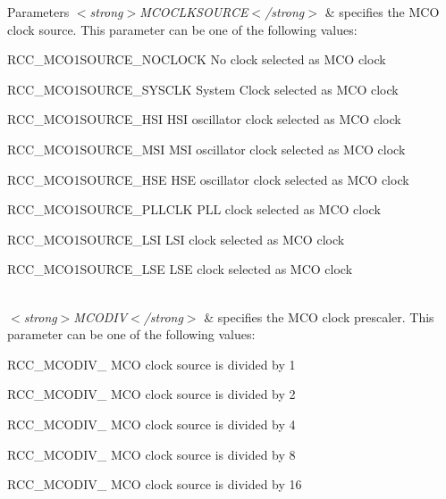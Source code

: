 \begin{DoxyParams}{Parameters}
{\em $<$strong$>$\-M\-C\-O\-C\-L\-K\-S\-O\-U\-R\-C\-E$<$/strong$>$} & specifies the M\-C\-O clock source. This parameter can be one of the following values\-: \begin{DoxyItemize}
\item R\-C\-C\-\_\-\-M\-C\-O1\-S\-O\-U\-R\-C\-E\-\_\-\-N\-O\-C\-L\-O\-C\-K No clock selected as M\-C\-O clock \item R\-C\-C\-\_\-\-M\-C\-O1\-S\-O\-U\-R\-C\-E\-\_\-\-S\-Y\-S\-C\-L\-K System Clock selected as M\-C\-O clock \item R\-C\-C\-\_\-\-M\-C\-O1\-S\-O\-U\-R\-C\-E\-\_\-\-H\-S\-I H\-S\-I oscillator clock selected as M\-C\-O clock \item R\-C\-C\-\_\-\-M\-C\-O1\-S\-O\-U\-R\-C\-E\-\_\-\-M\-S\-I M\-S\-I oscillator clock selected as M\-C\-O clock \item R\-C\-C\-\_\-\-M\-C\-O1\-S\-O\-U\-R\-C\-E\-\_\-\-H\-S\-E H\-S\-E oscillator clock selected as M\-C\-O clock \item R\-C\-C\-\_\-\-M\-C\-O1\-S\-O\-U\-R\-C\-E\-\_\-\-P\-L\-L\-C\-L\-K P\-L\-L clock selected as M\-C\-O clock \item R\-C\-C\-\_\-\-M\-C\-O1\-S\-O\-U\-R\-C\-E\-\_\-\-L\-S\-I L\-S\-I clock selected as M\-C\-O clock \item R\-C\-C\-\_\-\-M\-C\-O1\-S\-O\-U\-R\-C\-E\-\_\-\-L\-S\-E L\-S\-E clock selected as M\-C\-O clock \end{DoxyItemize}
\\
\hline
{\em $<$strong$>$\-M\-C\-O\-D\-I\-V$<$/strong$>$} & specifies the M\-C\-O clock prescaler. This parameter can be one of the following values\-: \begin{DoxyItemize}
\item R\-C\-C\-\_\-\-M\-C\-O\-D\-I\-V\-\_ M\-C\-O clock source is divided by 1 \item R\-C\-C\-\_\-\-M\-C\-O\-D\-I\-V\-\_ M\-C\-O clock source is divided by 2 \item R\-C\-C\-\_\-\-M\-C\-O\-D\-I\-V\-\_ M\-C\-O clock source is divided by 4 \item R\-C\-C\-\_\-\-M\-C\-O\-D\-I\-V\-\_ M\-C\-O clock source is divided by 8 \item R\-C\-C\-\_\-\-M\-C\-O\-D\-I\-V\-\_ M\-C\-O clock source is divided by 16 \end{DoxyItemize}
\\
\hline
\end{DoxyParams}
